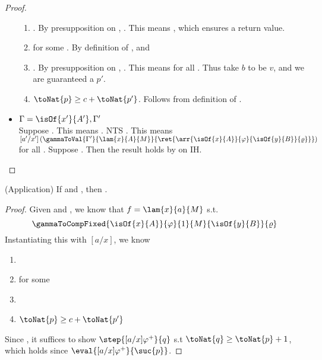 \begin{proof}
\begin{itemize}
\begin{enumerate}
         \item {}. By presupposition on , \gammaToPot{\cdot}{[a/x]\varphi}. This 
         means \isPot{[a/x]\varphi}, which ensures a return value. 
         \item {} for some . By definition of , 
          and 
         \item {}. By presupposition on , 
         . This 
         means \isPot{[a/x,b/y]\varrho} for all . Thus take $b$ to be $v$, and we are guaranteed a $p'$.
         \item $\toNat{p} \ge c + \toNat{p'}$. Follows from definition of .
     \end{enumerate}
    \item $\Gamma = \isOf{x'}{A'},\Gamma'$\\
    Suppose . This means
    . 
    NTS . 
    This means 
    $[a'/x']\left(\gammaToVal{\Gamma'}{\lam{x}{A}{M}}{\ret{\arr{\isOf{x}{A}}{\varphi}{\isOf{y}{B}}{\varrho}}}\right)$
    for all . Suppose . Then the result holds by  on IH.
\end{itemize}
\end{proof}

\begin{lemma}\textnormal{(Application)}
If  and , then 
.
\end{lemma}

\begin{proof}
Given  and , 
we know that $f = \lam{x}{a}{M}$ s.t. 
\[
    \gammaToCompFixed{\isOf{x}{A}}{\varphi}{1}{M}{\isOf{y}{B}}{\varrho}
\]
Instantiating this with $[a/x]$, we know
\begin{enumerate}
    \item {}
    \item {} for some 
    \item {}
    \item $\toNat{p} \ge c + \toNat{p'}$
\end{enumerate}

Since , it suffices to show 
$\step{[a/x]\varphi^+}{q}$ s.t $\toNat{q} \ge \toNat{p} + 1$, which 
holds since $\eval{[a/x]\varphi^+}{\suc{p}}$. 

\end{proof}

